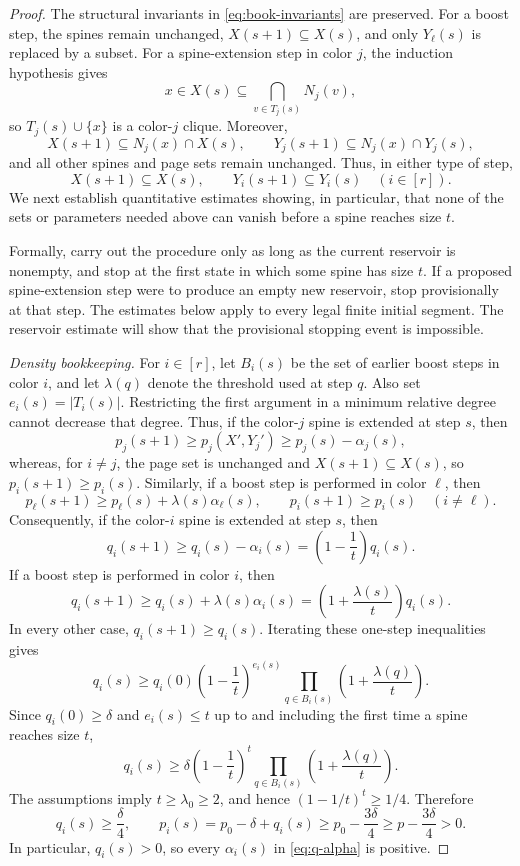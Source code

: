 \documentclass[twoside,12pt]{article}
\theoremstyle{definition}
\theoremstyle{remark}
\newcommand{\1}{\mathbf 1}
\begin{document}
\begin{proof}
The structural invariants in \eqref{eq:book-invariants} are preserved. For a
boost step, the spines remain unchanged, $X(s+1)\subseteq X(s)$, and only
$Y_\ell(s)$ is replaced by a subset. For a spine-extension step in color
$j$, the induction hypothesis gives
\[
 x\in X(s)\subseteq\bigcap_{v\in T_j(s)}N_j(v),
\]
so $T_j(s)\cup\{x\}$ is a color-$j$ clique. Moreover,
\[
 X(s+1)\subseteq N_j(x)\cap X(s),
 \qquad
 Y_j(s+1)\subseteq N_j(x)\cap Y_j(s),
\]
and all other spines and page sets remain unchanged. Thus, in either type of
step,
\[
 X(s+1)\subseteq X(s),
 \qquad
 Y_i(s+1)\subseteq Y_i(s)
 \quad(i\in[r]).
\]
We next establish quantitative estimates showing, in particular, that none
of the sets or parameters needed above can vanish before a spine reaches
size $t$.

Formally, carry out the procedure only as long as the current reservoir is
nonempty, and stop at the first state in which some spine has size $t$. If a
proposed spine-extension step were to produce an empty new reservoir, stop
provisionally at that step. The estimates below apply to every legal finite
initial segment. The reservoir estimate will show that the provisional
stopping event is impossible.

\medskip
\noindent\emph{Density bookkeeping.}
For $i\in[r]$, let $B_i(s)$ be the set of earlier boost steps in color $i$,
and let $\lambda(q)$ denote the threshold used at step $q$. Also set
$ e_i(s)=|T_i(s)|$.
Restricting the first argument in a minimum relative degree cannot decrease
that degree. Thus, if the color-$j$ spine is extended at step $s$, then
\[
 p_j(s+1)\ge p_j(X',Y_j')\ge p_j(s)-\alpha_j(s),
\]
whereas, for $i\ne j$, the page set is unchanged and
$X(s+1)\subseteq X(s)$, so $p_i(s+1)\ge p_i(s)$. Similarly, if a boost step
is performed in color $\ell$, then
\[
 p_\ell(s+1)\ge p_\ell(s)+\lambda(s)\alpha_\ell(s),
 \qquad
 p_i(s+1)\ge p_i(s)\quad(i\ne\ell).
\]
Consequently, if the color-$i$ spine is extended at step $s$, then
\[
 q_i(s+1)
 \ge q_i(s)-\alpha_i(s)
 =\left(1-\frac1t\right)q_i(s).
\]
If a boost step is performed in color $i$, then
\[
 q_i(s+1)
 \ge q_i(s)+\lambda(s)\alpha_i(s)
 =\left(1+\frac{\lambda(s)}t\right)q_i(s).
\]
In every other case, $q_i(s+1)\ge q_i(s)$. Iterating these one-step
inequalities gives
\[
 q_i(s)
 \ge q_i(0)\left(1-\frac1t\right)^{e_i(s)}
 \prod_{q\in B_i(s)}\left(1+\frac{\lambda(q)}t\right).
\]
Since $q_i(0)\ge\delta$ and $e_i(s)\le t$ up to and including the first
time a spine reaches size $t$,
\begin{equation}\label{eq:q-product}
 q_i(s)
 \ge\delta\left(1-\frac1t\right)^t
 \prod_{q\in B_i(s)}\left(1+\frac{\lambda(q)}t\right).
\end{equation}
The assumptions imply $t\ge\lambda_0\ge2$, and hence
$(1-1/t)^t\ge1/4$. Therefore
\begin{equation}\label{eq:p-lower}
 q_i(s)\ge\frac\delta4,
 \qquad
 p_i(s)=p_0-\delta+q_i(s)
 \ge p_0-\frac{3\delta}{4}
 \ge p-\frac{3\delta}{4}>0.
\end{equation}
In particular, $q_i(s)>0$, so every $\alpha_i(s)$ in
\eqref{eq:q-alpha} is positive.


\end{proof}
\end{document}
